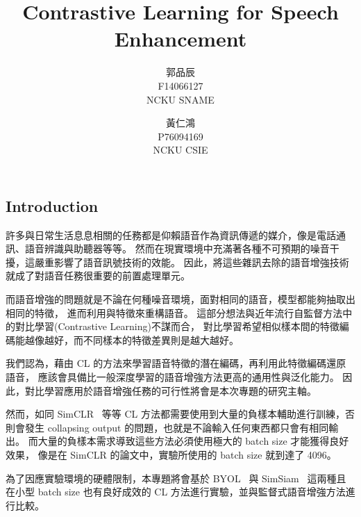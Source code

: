 \documentclass[10pt,twocolumn,letterpaper]{article}
\begin{document}
\begin{CJK}{UTF8}{bkai}
   \title{Contrastive Learning for Speech Enhancement}

   \author{
      郭品辰\\
      F14066127\\
      NCKU SNAME
      \and
      黃仁鴻\\
      P76094169\\
      NCKU CSIE
   }

   \maketitle



   \section{Introduction}

   許多與日常生活息息相關的任務都是仰賴語音作為資訊傳遞的媒介，像是電話通訊、語音辨識與助聽器等等。
   然而在現實環境中充滿著各種不可預期的噪音干擾，這嚴重影響了語音訊號技術的效能。
   因此，將這些雜訊去除的語音增強技術就成了對語音任務很重要的前置處理單元。

   而語音增強的問題就是不論在何種噪音環境，面對相同的語音，模型都能夠抽取出相同的特徵，
   進而利用與特徵來重構語音。
   這部分想法與近年流行自監督方法中的對比學習(Contrastive Learning)不謀而合，
   對比學習希望相似樣本間的特徵編碼能越像越好，而不同樣本的特徵差異則是越大越好。

   我們認為，藉由 CL 的方法來學習語音特徵的潛在編碼，再利用此特徵編碼還原語音，
   應該會具備比一般深度學習的語音增強方法更高的通用性與泛化能力。
   因此，對比學習應用於語音增強任務的可行性將會是本次專題的研究主軸。

   然而，如同 SimCLR~\cite{SimCLR} 等等 CL 方法都需要使用到大量的負樣本輔助進行訓練，否則會發生
   collapsing output 的問題，也就是不論輸入任何東西都只會有相同輸出。
   而大量的負樣本需求導致這些方法必須使用極大的 batch size 才能獲得良好效果，
   像是在 SimCLR 的論文中，實驗所使用的 batch size 就到達了 4096。

   為了因應實驗環境的硬體限制，本專題將會基於 BYOL~\cite{BYOL} 與
   SimSiam~\cite{SimSiam}
   這兩種且在小型 batch size 也有良好成效的 CL 方法進行實驗，並與監督式語音增強方法進行比較。


\end{CJK}
\end{document}

